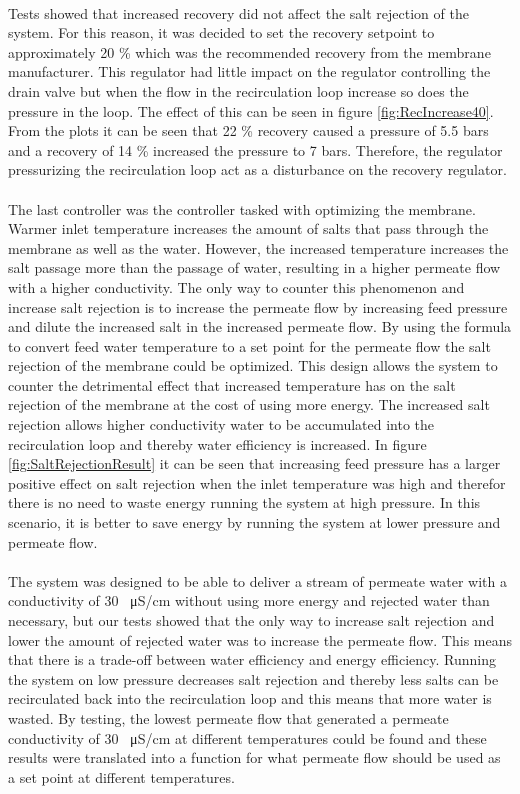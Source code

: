 \\
Tests showed that increased recovery did not affect the salt rejection of the system. For this reason, it was decided to set the recovery setpoint to approximately 20 \% which was the recommended recovery from the membrane manufacturer. This regulator had little impact on the regulator controlling the drain valve but when the flow in the recirculation loop increase so does the pressure in the loop. The effect of this can be seen in figure \ref{fig:RecIncrease40}. From the plots it can be seen that 22 \% recovery caused a pressure of 5.5 bars and a recovery of 14 \% increased the pressure to 7 bars. Therefore, the regulator pressurizing the recirculation loop act as a disturbance on the recovery regulator.\\
\\
The last controller was the controller tasked with optimizing the membrane. Warmer inlet temperature increases the amount of salts that pass through the membrane as well as the water. However, the increased temperature increases the salt passage more than the passage of water, resulting in a higher permeate flow with a higher conductivity. The only way to counter this phenomenon and increase salt rejection is to increase the permeate flow by increasing feed pressure and dilute the increased salt in the increased permeate flow. By using the formula to convert feed water temperature to a set point for the permeate flow the salt rejection of the membrane could be optimized. This design allows the system to counter the detrimental effect that increased temperature has on the salt rejection of the membrane at the cost of using more energy. The increased salt rejection allows higher conductivity water to be accumulated into the recirculation loop and thereby water efficiency is increased. In figure \ref{fig:SaltRejectionResult} it can be seen that increasing feed pressure has a larger positive effect on salt rejection when the inlet temperature was high and therefor there is no need to waste energy running the system at high pressure. In this scenario, it is better to save energy by running the system at lower pressure and permeate flow. \\
\\
The system was designed to be able to deliver a stream of permeate water with a conductivity of 30 \SI{}{\micro\siemens}/cm without using more energy and rejected water than necessary, but our tests showed that the only way to increase salt rejection and lower the amount of rejected water was to increase the permeate flow. This means that there is a trade-off between water efficiency and energy efficiency. Running the system on low pressure decreases salt rejection and thereby less salts can be recirculated back into the recirculation loop and this means that more water is wasted. By testing, the lowest permeate flow that generated a permeate conductivity of 30 \SI{}{\micro\siemens}/cm at different temperatures could be found and these results were translated into a function for what permeate flow should be used as a set point at different temperatures. 

